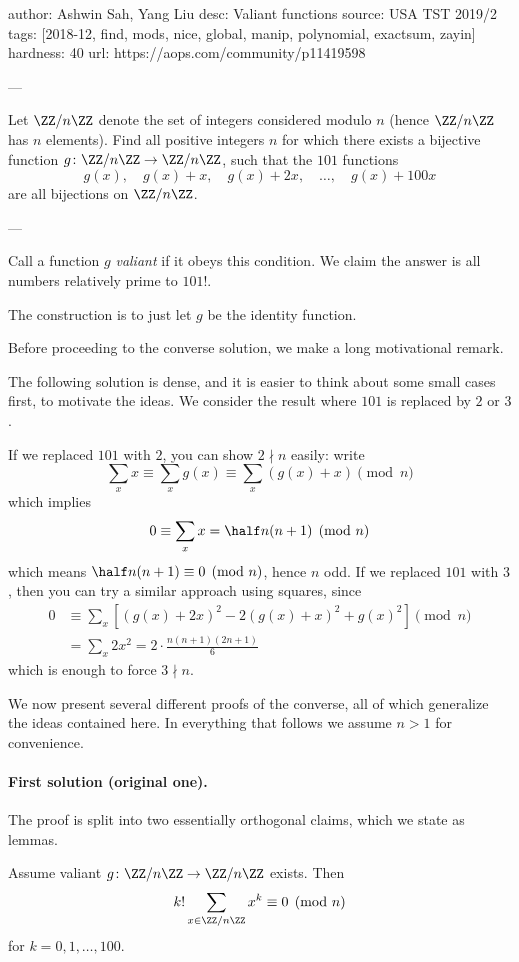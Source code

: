author: Ashwin Sah, Yang Liu
desc: Valiant functions
source: USA TST 2019/2
tags: [2018-12, find, mods, nice, global, manip, polynomial, exactsum, zayin]
hardness: 40
url: https://aops.com/community/p11419598

---

Let $\ZZ/n\ZZ$ denote the set of integers considered modulo $n$
(hence $\ZZ/n\ZZ$ has $n$ elements).
Find all positive integers $n$ for which there exists a bijective function
$g \colon \ZZ/n\ZZ \to \ZZ/n\ZZ$,
such that the $101$ functions
\[ g(x), \quad g(x)+x, \quad g(x)+2x, \quad \dots, \quad g(x)+100x \]
are all bijections on $\ZZ/n\ZZ$.

---

Call a function $g$ \emph{valiant} if it obeys this condition.
We claim the answer is all numbers relatively prime to $101!$.

The construction is to just let $g$ be the identity function.

Before proceeding to the converse solution,
we make a long motivational remark.
\begin{remark*}
  The following solution is dense,
  and it is easier to think about some small cases first,
  to motivate the ideas.
  We consider the result
  where $101$ is replaced by $2$ or $3$.
  \begin{itemize}
    \ii If we replaced $101$ with $2$,
    you can show $2 \nmid n$ easily: write
    \[ \sum_x x \equiv \sum_x g(x) \equiv \sum_x (g(x) + x ) \pmod n \]
    which implies
    \[ 0 \equiv \sum_x x = \half n (n+1) \pmod n \]
    which means $\half n(n+1) \equiv 0 \pmod n$, hence $n$ odd.
    \ii If we replaced $101$ with $3$,
    then you can try a similar approach using squares, since
    \begin{align*}
      0 &\equiv \sum_x \left[ \left( g(x)+2x \right)^2
      - 2\left( g(x)+x \right)^2
      + g(x)^2 \right] \pmod n\\
      &= \sum_x 2x^2 = 2 \cdot \frac{n(n+1)(2n+1)}{6}
    \end{align*}
    which is enough to force $3 \nmid n$.
  \end{itemize}
\end{remark*}
We now present several different proofs of the converse,
all of which generalize the ideas contained here.
In everything that follows we assume $n > 1$ for convenience.

\paragraph{First solution (original one).}
The proof is split into two essentially orthogonal claims,
which we state as lemmas.
\begin{lemma*}
  Assume valiant $g \colon \ZZ/n\ZZ \to \ZZ/n\ZZ$ exists.
  Then \[ k! \sum_{x \in \ZZ/n\ZZ} x^k \equiv 0 \pmod{n} \]
  for $k = 0, 1, \dots, 100$.
\end{lemma*}

